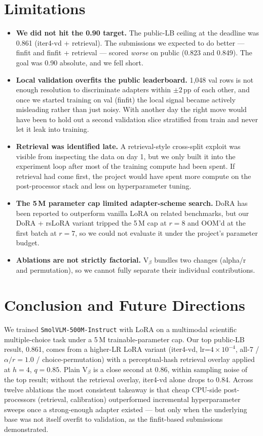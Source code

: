 \documentclass[11pt]{article}
\begin{document}
\section{Limitations}

\label{sec:limitations}
\begin{itemize}
  \item \textbf{We did not hit the 0.90 target.} The public-LB ceiling at the deadline was 0.861 (iter4-vd + retrieval). The submissions we expected to do better --- finfit and finfit + retrieval --- scored \emph{worse} on public (0.823 and 0.849). The goal was 0.90 absolute, and we fell short.
  \item \textbf{Local validation overfits the public leaderboard.} 1{,}048 val rows is not enough resolution to discriminate adapters within $\pm 2$\,pp of each other, and once we started training on val (finfit) the local signal became actively misleading rather than just noisy. With another day the right move would have been to hold out a second validation slice stratified from train and never let it leak into training.
  \item \textbf{Retrieval was identified late.} A retrieval-style cross-split exploit was visible from inspecting the data on day 1, but we only built it into the experiment loop after most of the training compute had been spent. If retrieval had come first, the project would have spent more compute on the post-processor stack and less on hyperparameter tuning.
  \item \textbf{The 5\,M parameter cap limited adapter-scheme search.} DoRA \citep{liu2024dora} has been reported to outperform vanilla LoRA on related benchmarks, but our DoRA + rsLoRA variant tripped the 5\,M cap at $r=8$ and OOM'd at the first batch at $r=7$, so we could not evaluate it under the project's parameter budget.
  \item \textbf{Ablations are not strictly factorial.} V$_\beta$ bundles two changes (alpha/r and permutation), so we cannot fully separate their individual contributions.
\end{itemize}

\section{Conclusion and Future Directions}

We trained \texttt{SmolVLM-500M-Instruct} with LoRA on a multimodal scientific multiple-choice task under a 5\,M trainable-parameter cap. Our top public-LB result, 0.861, comes from a higher-LR LoRA variant (iter4-vd, lr=$4\!\times\!10^{-4}$, all-7 / $\alpha/r=1.0$ / choice-permutation) with a perceptual-hash retrieval overlay applied at $h=4$, $q=0.85$. Plain V$_\beta$ is a close second at 0.86, within sampling noise of the top result; without the retrieval overlay, iter4-vd alone drops to 0.84. Across twelve ablations the most consistent takeaway is that cheap CPU-side post-processors (retrieval, calibration) outperformed incremental hyperparameter sweeps once a strong-enough adapter existed --- but only when the underlying base was not itself overfit to validation, as the finfit-based submissions demonstrated.
\end{document}
